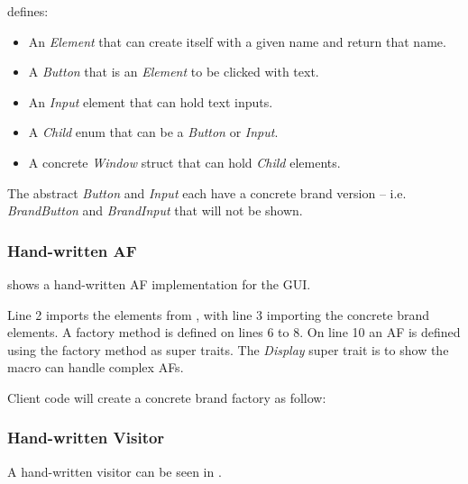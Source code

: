 
 defines:
\begin{itemize}
	\item An \textit{Element} that can create itself with a given name and return that name.
	\item A \textit{Button} that is an \textit{Element} to be clicked with text.
	\item An \textit{Input} element that can hold text inputs.
	\item A \textit{Child} enum that can be a \textit{Button} or \textit{Input}.
	\item A concrete \textit{Window} struct that can hold \textit{Child} elements.
\end{itemize}

The abstract \textit{Button} and \textit{Input} each have a concrete brand version -- i.e. \textit{BrandButton} and \textit{BrandInput} that will not be shown.

\subsubsection{Hand-written AF}
 shows a hand-written AF implementation for the GUI.


Line 2 imports the elements from , with line 3 importing the concrete brand elements.
A factory method is defined on lines 6 to 8.
On line 10 an AF is defined using the factory method as super traits.
The \textit{Display} super trait is to show the macro can handle complex AFs.

Client code will create a concrete brand factory as follow:


\subsubsection{Hand-written Visitor}
A hand-written visitor can be seen in .


